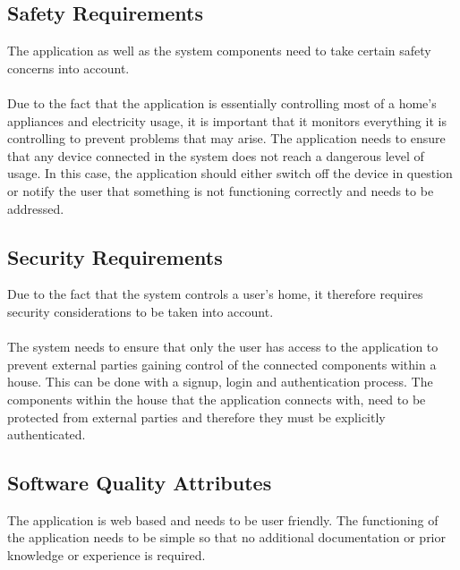 \documentclass[11pt, a4paper]{article}
\begin{document}
	\subsection{Safety Requirements} 
	The application as well as the system components need to take certain safety concerns into account. 
	\\\\
	Due to the fact that the application is essentially controlling most of a home's appliances and electricity usage, it is important that it monitors everything it is controlling to prevent problems that may arise. The application needs to ensure that any device connected in the system does not reach a dangerous level of usage. In this case, the application should either switch off the device in question or notify the user that something is not functioning correctly and needs to be addressed. 
	
	\subsection{Security Requirements}
	Due to the fact that the system controls a user's home, it therefore requires security considerations to be taken into account.
	\\\\
	The system needs to ensure that only the user has access to the application to prevent external parties gaining control of the connected components within a house. This can be done with a signup, login and authentication process. 
	The components within the house that the application connects with, need to be protected from external parties and therefore they must be explicitly authenticated. 
	
	\subsection{Software Quality Attributes}
	The application is web based and needs to be user friendly. The functioning of the application needs to be simple so that no additional documentation or prior knowledge or experience is required. 
	
	
\end{document}
